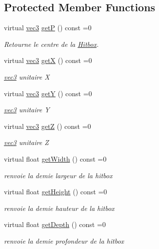 \subsection*{Protected Member Functions}
\begin{DoxyCompactItemize}
\item 
virtual \hyperlink{structvec3}{vec3} \hyperlink{class_hitbox_a2572250e152f89c05e68f9fb0a03bf7a}{get\+P} () const =0
\begin{DoxyCompactList}\small\item\em Retourne le centre de la \hyperlink{class_hitbox}{Hitbox}. \end{DoxyCompactList}\item 
virtual \hyperlink{structvec3}{vec3} \hyperlink{class_hitbox_a25ee2fb5e0556399bc8012073e461411}{get\+X} () const =0
\begin{DoxyCompactList}\small\item\em \hyperlink{structvec3}{vec3} unitaire X \end{DoxyCompactList}\item 
virtual \hyperlink{structvec3}{vec3} \hyperlink{class_hitbox_acf6cfd480e5e1d925386a1225713ea13}{get\+Y} () const =0
\begin{DoxyCompactList}\small\item\em \hyperlink{structvec3}{vec3} unitaire Y \end{DoxyCompactList}\item 
virtual \hyperlink{structvec3}{vec3} \hyperlink{class_hitbox_a2a024cefac26e2fb8db4ecc9010251c8}{get\+Z} () const =0
\begin{DoxyCompactList}\small\item\em \hyperlink{structvec3}{vec3} unitaire Z \end{DoxyCompactList}\item 
virtual float \hyperlink{class_hitbox_a5805a4ad2b59f303892af5dfca73a41e}{get\+Width} () const =0
\begin{DoxyCompactList}\small\item\em renvoie la demie largeur de la hitbox \end{DoxyCompactList}\item 
virtual float \hyperlink{class_hitbox_a2393fb817af93cbeacfb140f4f30c1a0}{get\+Height} () const =0
\begin{DoxyCompactList}\small\item\em renvoie la demie hauteur de la hitbox \end{DoxyCompactList}\item 
virtual float \hyperlink{class_hitbox_a100e9cdbd7e85179e64c9679c28354ee}{get\+Depth} () const =0
\begin{DoxyCompactList}\small\item\em renvoie la demie profondeur de la hitbox \end{DoxyCompactList}\end{DoxyCompactItemize}



